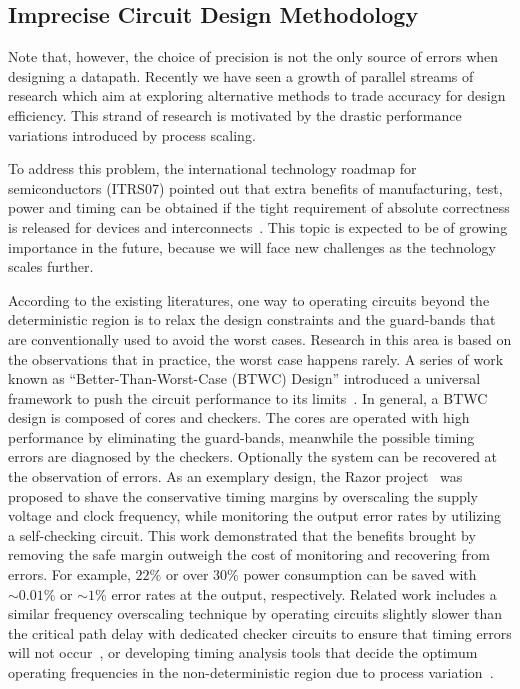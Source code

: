 \documentclass[journal]{IEEEtran}
\begin{document}
\subsection{Imprecise Circuit Design Methodology}\label{Section_Background_Imprecise}
Note that, however, the choice of precision is not the only source of errors when designing a datapath. Recently we have seen a growth of parallel streams of research which aim at exploring alternative methods to trade accuracy for design efficiency. This strand of research is motivated by the drastic performance variations introduced by process scaling.


To address this problem, the international technology roadmap for semiconductors (ITRS07) pointed out that extra benefits of manufacturing, test, power and timing can be obtained if the tight requirement of absolute correctness is released for devices and interconnects~\cite{semiconductor2007international}. This topic is expected to be of growing importance in the future, because we will face new challenges as the technology scales further.

According to the existing literatures, one way to operating circuits beyond the deterministic region is to relax the design constraints and the guard-bands that are conventionally used to avoid the worst cases. Research in this area is based on the observations that in practice, the worst case happens rarely. A series of work known as ``Better-Than-Worst-Case (BTWC) Design'' introduced a universal framework to push the circuit performance to its limits~\cite{BetterThanWS2005}. In general, a BTWC design is composed of cores and checkers. The cores are operated with high performance by eliminating the guard-bands, meanwhile the possible timing errors are diagnosed by the checkers. Optionally the system can be recovered at the observation of errors. As an exemplary design, the Razor project~\cite{Razor2003,Razor2004} was proposed to shave the conservative timing margins by overscaling the supply voltage and clock frequency, while monitoring the output error rates by utilizing a self-checking circuit. This work demonstrated that the benefits brought by removing the safe margin outweigh the cost of monitoring and recovering from errors. For example, $22\%$ or over $30\%$ power consumption can be saved with $\sim0.01\%$ or $\sim1\%$ error rates at the output, respectively. Related work includes a similar frequency overscaling technique by operating circuits slightly slower than the critical path delay with dedicated checker circuits to ensure that timing errors will not occur~\cite{TEAtime2004}, or developing timing analysis tools that decide the optimum operating frequencies in the non-deterministic region due to process variation~\cite{ProbabilisticSTA}.
\end{document}
